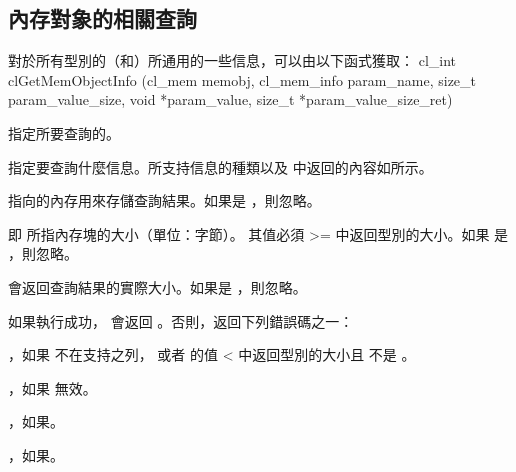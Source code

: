 \subsection{內存對象的相關查詢}

對於所有型別的（和）所通用的一些信息，可以由以下函式獲取：
\startclc
cl_int clGetMemObjectInfo (cl_mem memobj,
			cl_mem_info param_name,
			size_t param_value_size,
			void *param_value,
			size_t *param_value_size_ret)
\stopclc

 指定所要查詢的。

 指定要查詢什麼信息。所支持信息的種類以及  中返回的內容如所示。

 指向的內存用來存儲查詢結果。如果是 ，則忽略。

 即  所指內存塊的大小（單位：字節）。
其值必須 >= 中返回型別的大小。如果  是 ，則忽略。

 會返回查詢結果的實際大小。如果是 ，則忽略。

如果執行成功， 會返回 。否則，返回下列錯誤碼之一：
\startigBase
\item {}，如果  不在支持之列，
  或者  的值 < 中返回型別的大小且  不是 。
\item {}，如果  無效。
\item {}，如果\scdevfailres。
\item {}，如果\schostfailres。
\stopigBase

{}

